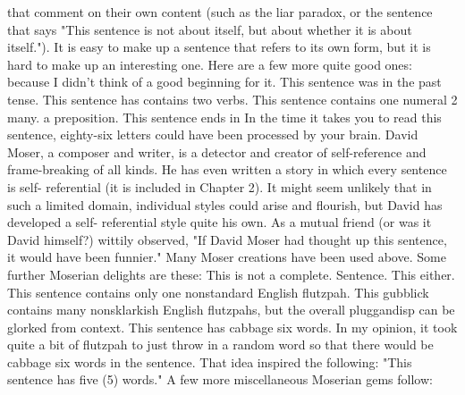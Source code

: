 that comment on their own content (such as the liar paradox, or the sentence that says "This sentence is not about itself, but about whether it is about itself."). It is easy to make up a sentence that refers to its own form, but it is hard to make up an interesting one. Here are a few more quite good ones: 
because I didn't think of a good beginning for it. 
This sentence was in the past tense. 
This sentence has contains two verbs. 
This sentence contains one numeral 2 many. 
a preposition. This sentence ends in 
In the time it takes you to read this sentence, eighty-six letters could have been processed by your brain. 
\separator
David Moser, a composer and writer, is a detector and creator of self-reference and frame-breaking of all kinds. He has even written a story in which every sentence is self- referential (it is included in Chapter 2). It might seem unlikely that in such a limited domain, individual styles could arise and flourish, but David has developed a self- referential style quite his own. As a mutual friend (or was it David himself?) wittily observed, "If David Moser had thought up this sentence, it would have been funnier." Many Moser creations have been used above. Some further Moserian delights are these: 
This is not a complete. Sentence. This either. 
This sentence contains only one nonstandard English flutzpah. 
This gubblick contains many nonsklarkish English flutzpahs, but the overall pluggandisp can be glorked from context. 
This sentence has cabbage six words. 
In my opinion, it took quite a bit of flutzpah to just throw in a random word so that there would be cabbage six words in the sentence. That idea inspired the following: "This sentence has five (5) words." A few more miscellaneous Moserian gems follow: 



